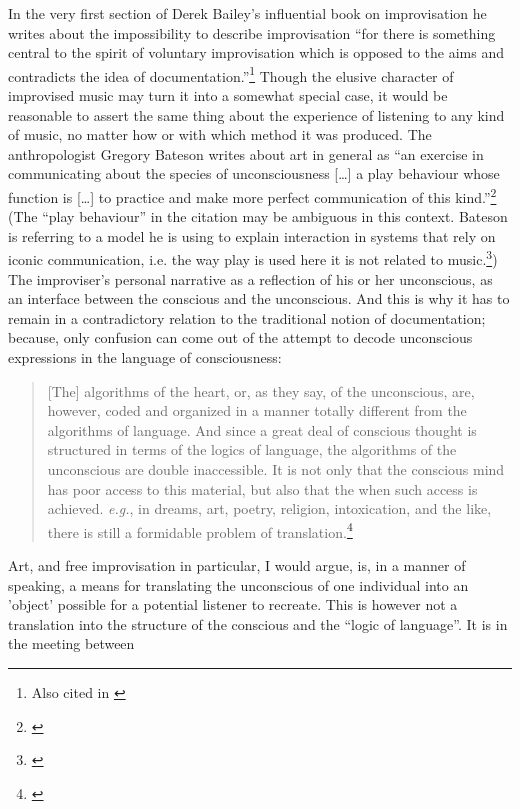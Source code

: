 In the very first section of Derek Bailey's influential book on
improvisation he writes about the impossibility to describe
improvisation ``for there is something central to the spirit of
voluntary improvisation which is opposed to the aims and contradicts
the idea of documentation.''\footnote{\citet[ix]{bailey92} Also cited
  in \citet[12-3]{nettl98:2}} Though the elusive character of
improvised music may turn it into a somewhat special case, it would be
reasonable to assert the same thing about the experience of listening
to any kind of music, no matter how or with which method it was
produced. The anthropologist Gregory Bateson writes about art in
general as ``an exercise in communicating about the species of
unconsciousness [\ldots] a play behaviour whose function is [\ldots]
to practice and make more perfect communication of this
kind.''\footnote{\citet[p. 137]{bateson72}} (The ``play behaviour'' in the
citation may be ambiguous in this context. Bateson is
referring to a model he is using to explain interaction in systems
that rely on iconic communication, i.e. the way play is used here it
is not related to music.\footnote{\citep[See][]{bateson72:play}}) The
improviser's personal narrative as a reflection of his or her
unconscious, as an interface between the conscious and the
unconscious. And this is why it has to remain in a contradictory
relation to the traditional notion of documentation; because, only
confusion can come out of the attempt to decode unconscious
expressions in the language of consciousness:
\begin{quote}
  [The] algorithms of the heart, or, as they say, of the unconscious,
  are, however, coded and organized in a manner totally different from
  the algorithms of language. And since a great deal of conscious
  thought is structured in terms of the logics of language, the
  algorithms of the unconscious are double inaccessible. It is not
  only that the conscious mind has poor access to this material, but
  also that the when such access is achieved. \emph{e.g.}, in dreams,
  art, poetry, religion, intoxication, and the like, there is still a
  formidable problem of translation.\footnote{\citet[p. 139]{bateson72}}
\end{quote}
Art, and free improvisation in particular, I would argue, is, in a
manner of speaking, a means for translating the unconscious of one
individual into an 'object' possible for a potential listener to
recreate. This is however not a translation into the structure of the
conscious and the ``logic of language''. It is in the meeting between
